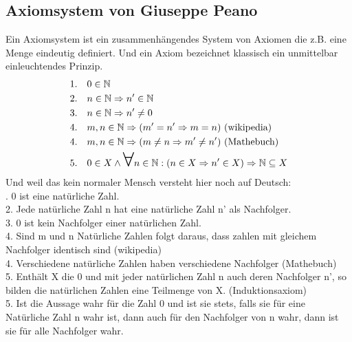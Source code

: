 \documentclass[a4paper]{scrartcl}
\newcommand\bigforall{\mbox{\huge $\forall$}}
\begin{document}
\subsection{Axiomsystem von Giuseppe Peano}
Ein Axiomsystem ist ein zusammenhängendes System von Axiomen die z.B. eine Menge eindeutig definiert. Und ein Axiom bezeichnet klassisch ein unmittelbar einleuchtendes Prinzip.\\
\begin{align}
1.& \hspace{10pt} 0 \in \mathbb{N} \\
2.& \hspace{10pt} n \in \mathbb{N} \Rightarrow n' \in \mathbb{N} \\
3.& \hspace{10pt} n \in \mathbb{N} \Rightarrow n' \neq 0 \\
4.&  \hspace{10pt} m,n \in \mathbb{N} \Rightarrow (m' = n' \Rightarrow m = n) \text{ (wikipedia)}\\
4.& \hspace{10pt} m,n \in \mathbb{N} \Rightarrow (m \neq n \Rightarrow m' \neq n')  \text{ (Mathebuch)}\\
5.& \hspace{10pt} 0 \in X \wedge \bigforall n \in \mathbb{N}: (n \in X \Rightarrow n' \in X) \Rightarrow \mathbb{N} \subseteq X
\end{align} 
Und weil das kein normaler Mensch versteht hier noch auf Deutsch: \\
. 0 ist eine natürliche Zahl. \\
2. Jede natürliche Zahl n hat eine natürliche Zahl n' als Nachfolger. \\
3. 0 ist kein Nachfolger einer natürlichen Zahl. \\
4. Sind m und n Natürliche Zahlen folgt daraus, dass zahlen mit gleichem Nachfolger identisch sind (wikipedia)\\
4. Verschiedene natürliche Zahlen haben verschiedene Nachfolger (Mathebuch) \\
5. Enthält X die 0 und mit jeder natürlichen Zahl n auch deren Nachfolger n', so bilden die natürlichen Zahlen eine Teilmenge von X. (Induktionsaxiom)\\
5. Ist die Aussage wahr für die Zahl 0 und ist sie stets, falls sie für eine Natürliche Zahl n wahr ist, dann auch für den Nachfolger von n wahr, dann ist sie für alle Nachfolger wahr. \\
\end{document}
